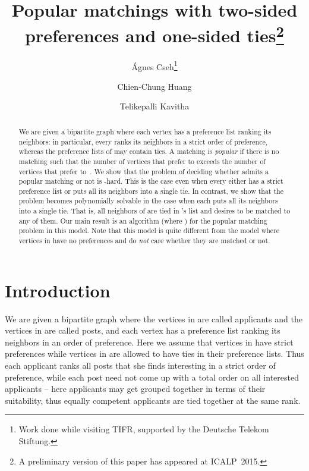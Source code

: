 \documentclass[11pt]{llncs}
\begin{document}
\pagestyle{plain}
\title{Popular matchings with two-sided preferences and one-sided ties\thanks{A preliminary version of this paper has appeared at ICALP~2015.}}
\author{\'{A}gnes Cseh\thanks{Work done while visiting TIFR, supported by the Deutsche Telekom Stiftung.}
\and Chien-Chung Huang\and Telikepalli Kavitha}
\maketitle


\begin{abstract}
We are given a bipartite graph  where each vertex has a preference list
ranking its neighbors: in particular, every  ranks its neighbors in a strict order 
of preference, whereas the preference lists of  may contain ties. A matching  is 
\emph{popular} if there is no matching  such that the number of vertices that prefer  
to  exceeds the number of vertices that prefer  to~. We show that the problem of deciding whether 
 admits a popular matching or not is -hard. This is the case even when every 
 either has a strict preference list or puts all its neighbors into a single tie. 
In contrast, we show that the problem becomes polynomially solvable in the case when each 
 puts all its neighbors into a single tie. That is, all neighbors of  are tied 
in 's list and  desires to be matched to any of them. Our main result is an  algorithm 
(where ) for the popular matching problem in this model. Note that this model 
is quite different from the model where vertices in  have no preferences and do {\em not} 
care whether they are matched or not.
\end{abstract}

\section{Introduction}
\label{sec:intro}
We are given a bipartite graph  where the vertices in  are called 
applicants and the vertices in  are called posts, and each vertex has a preference list 
ranking its neighbors in an order of preference. Here we assume that vertices in  have 
strict preferences while vertices in  are allowed to have ties in their preference lists. 
Thus each applicant ranks all posts that she finds interesting in a strict order of preference,
while each post need not come up with a total order on all interested applicants -- here 
applicants may get grouped together in terms of their suitability, thus equally competent 
applicants are tied together at the same rank. 
\end{document}
